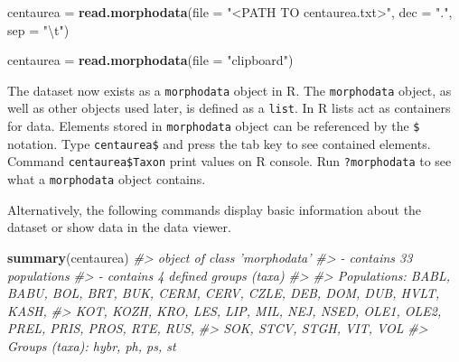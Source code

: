 \documentclass[
]{article}
\newenvironment{Shaded}{\begin{snugshade}}{\end{snugshade}}
\newcommand{\CharTok}[1]{\textcolor[rgb]{0.31,0.60,0.02}{#1}}
\newcommand{\CommentTok}[1]{\textcolor[rgb]{0.56,0.35,0.01}{\textit{#1}}}
\newcommand{\DataTypeTok}[1]{\textcolor[rgb]{0.13,0.29,0.53}{#1}}
\newcommand{\KeywordTok}[1]{\textcolor[rgb]{0.13,0.29,0.53}{\textbf{#1}}}
\newcommand{\NormalTok}[1]{#1}
\newcommand{\StringTok}[1]{\textcolor[rgb]{0.31,0.60,0.02}{#1}}
\begin{document}
\begin{Shaded}
\begin{Highlighting}[]
\NormalTok{centaurea =}\StringTok{ }\KeywordTok{read.morphodata}\NormalTok{(}\DataTypeTok{file =} \StringTok{"<PATH TO centaurea.txt>"}\NormalTok{, }\DataTypeTok{dec =} \StringTok{"."}\NormalTok{, }\DataTypeTok{sep =} \StringTok{"}\CharTok{\textbackslash{}t}\StringTok{"}\NormalTok{)}
\end{Highlighting}
\end{Shaded}

\begin{Shaded}
\begin{Highlighting}[]
\NormalTok{centaurea =}\StringTok{ }\KeywordTok{read.morphodata}\NormalTok{(}\DataTypeTok{file =} \StringTok{"clipboard"}\NormalTok{)}
\end{Highlighting}
\end{Shaded}

The dataset now exists as a \texttt{morphodata} object in R. The
\texttt{morphodata} object, as well as other objects used later, is
defined as a \texttt{list}. In R lists act as containers for data.
Elements stored in \texttt{morphodata} object can be referenced by the
\texttt{\$} notation. Type \texttt{centaurea\$} and press the tab key to
see contained elements. Command \texttt{centaurea\$Taxon} print values
on R console. Run \texttt{?morphodata} to see what a \texttt{morphodata}
object contains.

Alternatively, the following commands display basic information about
the dataset or show data in the data viewer.

\begin{Shaded}
\begin{Highlighting}[]
\KeywordTok{summary}\NormalTok{(centaurea)}
\CommentTok{#> object of class 'morphodata'}
\CommentTok{#> - contains 33 populations}
\CommentTok{#> - contains 4 defined groups (taxa)}
\CommentTok{#> }
\CommentTok{#> Populations: BABL, BABU, BOL, BRT, BUK, CERM, CERV, CZLE, DEB, DOM, DUB, HVLT, KASH,}
\CommentTok{#>  KOT, KOZH, KRO, LES, LIP, MIL, NEJ, NSED, OLE1, OLE2, PREL, PRIS, PROS, RTE, RUS,}
\CommentTok{#>  SOK, STCV, STGH, VIT, VOL}
\CommentTok{#> Groups (taxa): hybr, ph, ps, st}
\end{Highlighting}
\end{Shaded}
\end{document}
